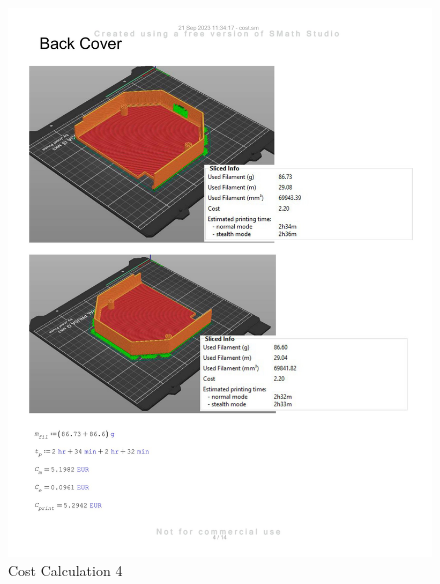 \begin{figure}[H]
    \centering
    \includegraphics[width=\linewidth]{texs/appendix/data/cost1-04.jpg}
    \caption{Cost Calculation 4}
    \label{fig:cost-calculation-4}
\end{figure}

